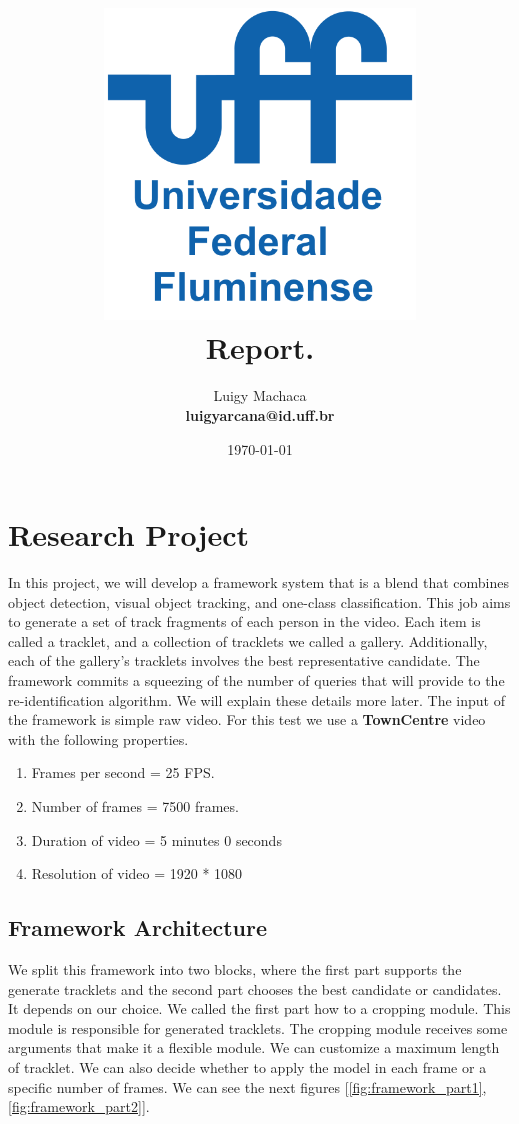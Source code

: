 \documentclass[a4paper]{article}
\title{
    \vspace*{1in}
    \includegraphics[width=3.25in]{figures/uff-logo.png} \\
    \vspace*{1.2in}
    \textbf{\huge Report.}
    \vspace{0.2in}\\
    \vspace{0.2in}
}
\author{Luigy Machaca \\
    \textbf{luigyarcana@id.uff.br} \\
}
\date{\today}
\begin{document}
\maketitle
\setcounter{page}{0}
\thispagestyle{empty}
\newpage


\section{Research Project}
In this project, we will develop a framework system that is a blend that combines object detection, visual object tracking, and one-class classification. This job aims to generate a set of track fragments of each person in the video. Each item is called a tracklet, and a collection of tracklets we called a gallery. Additionally, each of the gallery's tracklets involves the best representative candidate.
\leavevmode\newline
The framework commits a squeezing of the number of queries that will provide to the re-identification algorithm. We will explain these details more later.
\leavevmode\newline
The input of the framework is simple raw video. For this test we use a \textbf{TownCentre} \cite{townCenterDataset} video with the following properties.

\begin{enumerate}
    \item Frames per second = 25 FPS. \label{video:FPS}
    \item Number of frames = 7500 frames. \label{video:number_frames}
    \item Duration of video = 5 minutes 0 seconds \label{video:time}
    \item Resolution of video = 1920 * 1080 \label{video:size}
\end{enumerate}

\subsection{Framework Architecture}

We split this framework into two blocks, where the first part supports the generate tracklets and the second part chooses the best candidate or candidates. It depends on our choice.
\leavevmode\newline
We called the first part how to a cropping module. This module is responsible for generated tracklets. The cropping module receives some arguments that make it a flexible module. We can customize a maximum length of tracklet. We can also decide whether to apply the model in each frame or a specific number of frames.  We can see the next figures [\ref{fig:framework_part1},\ref{fig:framework_part2}].
\end{document}
